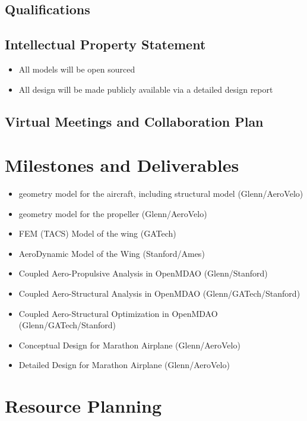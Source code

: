\documentclass[]{aiaa-tc}
\begin{document}
    \subsection{Qualifications}
    \subsection{Intellectual Property Statement}
        \begin{itemize}
            \item All models will be open sourced
            \item All design will be made publicly available via a detailed design report
        \end{itemize}

    \subsection{Virtual Meetings and Collaboration Plan}

\section{Milestones and Deliverables}

    \begin{itemize}
        \item geometry model for the aircraft, including structural model (Glenn/AeroVelo)
        \item geometry model for the propeller (Glenn/AeroVelo)
        \item FEM (TACS) Model of the wing (GATech)
        \item AeroDynamic Model of the Wing (Stanford/Ames)
        \item Coupled Aero-Propulsive Analysis in OpenMDAO (Glenn/Stanford)
        \item Coupled Aero-Structural Analysis in OpenMDAO (Glenn/GATech/Stanford)
        \item Coupled Aero-Structural Optimization in OpenMDAO (Glenn/GATech/Stanford)
        \item Conceptual Design for Marathon Airplane (Glenn/AeroVelo)
        \item Detailed Design for Marathon Airplane (Glenn/AeroVelo)
    \end{itemize}

  \section{Resource Planning}
\end{document}
